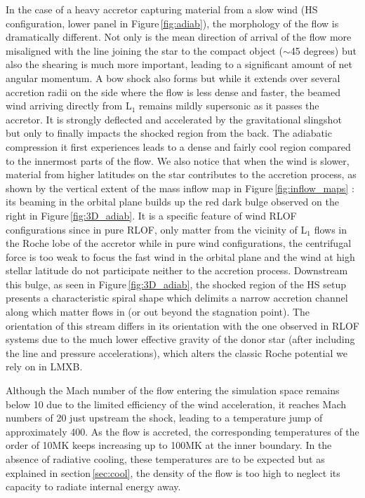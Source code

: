 \documentclass{aa}
\makeatletter
\newcommand*{\lmxb}{LMXB\@\xspace}
\newcommand*{\rlof}{RLOF\@\xspace}
\makeatother
\begin{document}
In the case of a heavy accretor capturing material from a slow wind (HS configuration, lower panel in Figure\,\ref{fig:adiab}), the morphology of the flow is dramatically different. Not only is the mean direction of arrival of the flow more misaligned with the line joining the star to the compact object ($\sim$45 degrees) but also the shearing is much more important, leading to a significant amount of net angular momentum. A bow shock also forms but while it extends over several accretion radii on the side where the flow is less dense and faster, the beamed wind arriving directly from L$_1$ remains mildly supersonic as it passes the accretor. It is strongly deflected and accelerated by the gravitational slingshot but only to finally impacts the shocked region from the back. The adiabatic compression it first experiences leads to a dense and fairly cool region compared to the innermost parts of the flow. We also notice that when the wind is slower, material from higher latitudes on the star contributes to the accretion process, as shown by the vertical extent of the mass inflow map in Figure\,\ref{fig:inflow_maps} : its beaming in the orbital plane builds up the red dark bulge observed on the right in Figure\,\ref{fig:3D_adiab}. It is a specific feature of wind \rlof configurations since in pure \rlof, only matter from the vicinity of L$_1$ flows in the Roche lobe of the accretor while in pure wind configurations, the centrifugal force is too weak to focus the fast wind in the orbital plane and the wind at high stellar latitude do not participate neither to the accretion process. Downstream this bulge, as seen in Figure\,\ref{fig:3D_adiab}, the shocked region of the HS setup presents a characteristic spiral shape which delimits a narrow accretion channel along which matter flows in (or out beyond the stagnation point). The orientation of this stream differs in its orientation with the one observed in \rlof systems due to the much lower effective gravity of the donor star (after including the line and pressure accelerations), which alters the classic Roche potential we rely on in \lmxb.

Although the Mach number of the flow entering the simulation space remains below 10 due to the limited efficiency of the wind acceleration, it reaches Mach numbers of 20 just upstream the shock, leading to a temperature jump of approximately 400. As the flow is accreted, the corresponding temperatures of the order of 10MK keeps increasing up to 100MK at the inner boundary. In the absence of radiative cooling, these temperatures are to be expected but as explained in section\,\ref{sec:cool}, the density of the flow is too high to neglect its capacity to radiate internal energy away. 
\end{document}

